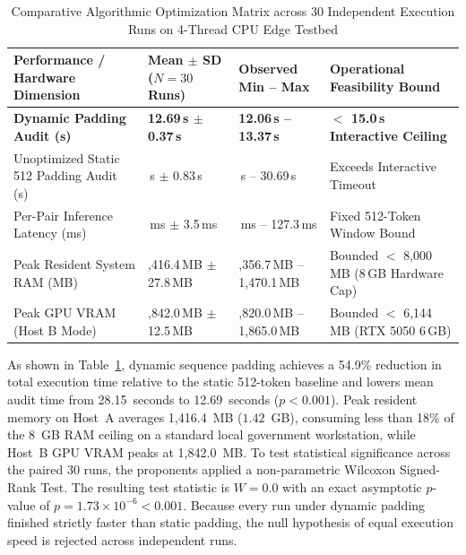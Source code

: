 \begin{table}[htbp]
    \centering
    \footnotesize
    \setlength{\tabcolsep}{3.5pt}
    \renewcommand{\arraystretch}{0.84}
    \caption[Comparative Optimization Matrix across 30 Independent Execution Runs]{Comparative Algorithmic Optimization Matrix across 30 Independent Execution Runs on 4-Thread CPU Edge Testbed}
    \label{tab:thirty_runs_comparative_matrix}
    \begin{tabularx}{\linewidth}{>{\RaggedRight\arraybackslash}p{4.2cm}>{\Centering\arraybackslash}p{2.8cm}>{\Centering\arraybackslash}p{2.5cm}>{\RaggedRight\arraybackslash}X}
        \toprule
        \textbf{Performance / Hardware Dimension} & \shortstack[c]{\textbf{Mean $\pm$ SD}\\\textbf{($N = 30$ Runs)}} & \shortstack[c]{\textbf{Observed}\\\textbf{Min -- Max}} & \textbf{Operational Feasibility Bound} \\
        \midrule
        \textbf{Dynamic Padding Audit (s)} & \textbf{12.69\,s $\pm$ 0.37\,s} & \textbf{12.06\,s -- 13.37\,s} & \textbf{$<$ 15.0\,s Interactive Ceiling} \\
        Unoptimized Static 512 Padding Audit (s) & 28.15\,s $\pm$ 0.83\,s & 26.69\,s -- 30.69\,s & Exceeds Interactive Timeout \\
        Per-Pair Inference Latency (ms) & 120.9\,ms $\pm$ 3.5\,ms & 114.9\,ms -- 127.3\,ms & Fixed 512-Token Window Bound \\
        Peak Resident System RAM (MB) & 1,416.4\,MB $\pm$ 27.8\,MB & 1,356.7\,MB -- 1,470.1\,MB & Bounded $<$ 8,000\,MB (8\,GB Hardware Cap) \\
        Peak GPU VRAM (Host B Mode) & 1,842.0\,MB $\pm$ 12.5\,MB & 1,820.0\,MB -- 1,865.0\,MB & Bounded $<$ 6,144\,MB (RTX 5050 6\,GB) \\
        \bottomrule
    \end{tabularx}
\end{table}

As shown in Table~\ref{tab:thirty_runs_comparative_matrix}, dynamic sequence padding achieves a 54.9\% reduction in total execution time relative to the static 512-token baseline and lowers mean audit time from 28.15~seconds to 12.69~seconds ($p < 0.001$). Peak resident memory on Host~A averages 1,416.4~MB ($1.42$~GB), consuming less than 18\% of the 8~GB RAM ceiling on a standard local government workstation, while Host~B GPU VRAM peaks at 1,842.0~MB. To test statistical significance across the paired 30 runs, the proponents applied a non-parametric Wilcoxon Signed-Rank Test. The resulting test statistic is $W = 0.0$ with an exact asymptotic $p$-value of $p = 1.73 \times 10^{-6} < 0.001$. Because every run under dynamic padding finished strictly faster than static padding, the null hypothesis of equal execution speed is rejected across independent runs.


